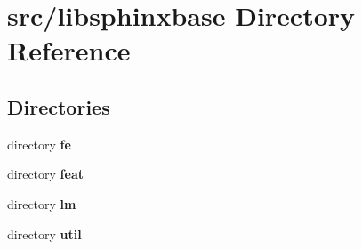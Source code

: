 \section{src/libsphinxbase Directory Reference}
\label{dir_3b5e6589d8d7d3e6424fe0fcd4bf9c2a}
\subsection*{Directories}
\begin{DoxyCompactItemize}
\item 
directory {\bf fe}
\item 
directory {\bf feat}
\item 
directory {\bf lm}
\item 
directory {\bf util}
\end{DoxyCompactItemize}
